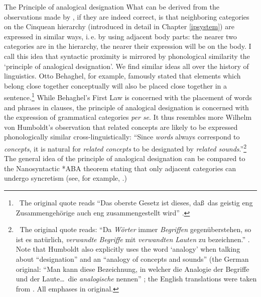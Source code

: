 \begin{savenotes}
\begin{digression}{The Principle of analogical designation}{}
\noindent What\label{analogicaldesignation} can be derived from the observations made by \citet{bross2017scope}, if they are indeed correct, is that neighboring categories on the Cinquean hierarchy (introduced in detail in Chapter \ref{ipsystem}) are expressed in similar ways, i.\,e. by using adjacent body parts: the nearer two categories are in the hierarchy, the nearer their expression will be on the body. I call this idea that syntactic proximity is mirrored by phonological similarity the `principle of analogical designation'. We find similar ideas all over the history of linguistics. Otto Behaghel, for example, famously stated that elements which belong close together conceptually will also be placed close together in a sentence.\footnote{ \, The original quote reads ``Das oberste Gesetz ist dieses, da\ss\ das geistig eng Zusammengeh\"orige auch eng zusammengestellt wird'' \citep[4]{behaghel1932}.} While Behaghel's First Law is concerned with the placement of words and phrases in clauses, the principle of analogical designation is concerned with the expression of grammatical categories \textit{per se}. It thus resembles more Wilhelm von Humboldt's observation that related concepts are likely to be expressed phonologically similar cross-linguistically: ``Since \textit{words} always correspond to \textit{concepts}, it is natural for \textit{related concepts} to be designated by \textit{related sounds}.''\footnote{ \textcolor{white}{n}The original quote reads: ``Da \textit{W\"orter} immer \textit{Begriffen} gegen\"uberstehen, so ist es nat\"urlich, \textit{verwandte Begriffe} mit \textit{verwandten Lauten} zu bezeichnen.'' \citet[75]{von1836kawi}. Note that Humboldt also explicitly uses the word `analogy' when talking about ``designation'' and an ``analogy of concepts and sounds'' (the German original: ``Man kann diese Bezeichnung, in welcher die Analogie der Begriffe und der Laute\dots\ die \textit{analogische} nennen'' \citet[81]{von1836kawi}; the English translations were taken from \citet{humboldt1999language}. All emphases in original. } The general idea of the principle of analogical designation can be compared to the Nanosyntactic *ABA theorem stating that only adjacent categories can undergo syncretism (see, for example, \citealt{bobalji2007comparative,bobalji2012universals,caha2009nanosyntax}.)


\end{digression}
\end{savenotes}
